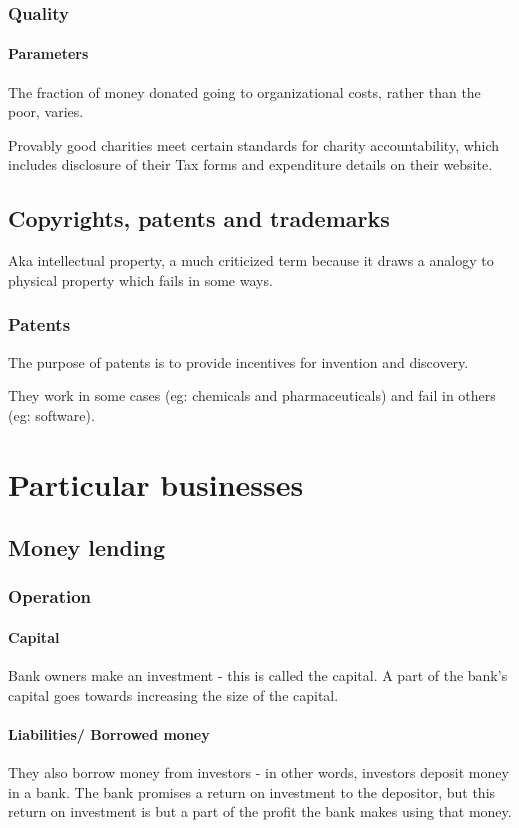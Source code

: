 \documentclass[oneside, article]{memoir}
\begin{document}
\section{Quality}
\subsection{Parameters}
The fraction of money donated going to organizational costs, rather than the poor, varies. 

Provably good charities meet certain standards for charity accountability, which includes disclosure of their Tax forms and expenditure details on their website.

\chapter{Copyrights, patents and trademarks}
Aka intellectual property, a much criticized term because it draws a analogy to physical property which fails in some ways.

\section{Patents}
The purpose of patents is to provide incentives for invention and discovery.

They work in some cases (eg: chemicals and pharmaceuticals) and fail in others (eg: software).


\tbc

\part{Particular businesses}
\chapter{Money lending}
\section{Operation}
\subsection{Capital}
Bank owners make an investment - this is called the capital. A part of the bank's capital goes towards increasing the size of the capital.

\subsection{Liabilities/ Borrowed money}
They also borrow money from investors - in other words, investors deposit money in a bank. The bank promises a return on investment to the depositor, but this return on investment is but a part of the profit the bank makes using that money.
\end{document}
